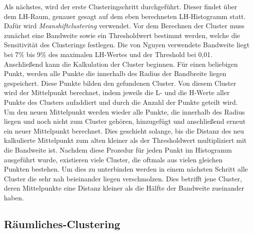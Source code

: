 Als nächstes, wird der erste Clusteringschritt durchgeführt. Dieser findet über dem LH-Raum, genauer gesagt auf dem eben berechneten LH-Histogramm statt. Dafür wird \textit{Meanshiftclustering} verwendet.
\newline
Vor dem Berechnen der Cluster muss zunächst eine Bandweite sowie ein Thresholdwert bestimmt werden, welche die Sensitivität des Clusterings festlegen.
\newline
Die von Nguyen \cite{nguyen2012clustering} verwendete Bandweite liegt bei 7\% bis 9\% des maximalen LH-Wertes und der Threshold bei 0,01. Anschließend kann die Kalkulation der Cluster beginnen.
\newline
Für einen beliebigen Punkt, werden alle Punkte die innerhalb des Radius der Bandbreite liegen gespeichert. Diese Punkte bilden den gefundenen Cluster. Von diesem Cluster wird der Mittelpunkt berechnet, indem jeweils die L- und die H-Werte aller Punkte des Clusters aufaddiert und durch die Anzahl der Punkte geteilt wird.
\newline
Um den neuen Mittelpunkt werden wieder alle Punkte, die innerhalb des Radius liegen und noch nicht zum Cluster gehören, hinzugefügt und anschließend erneut ein neuer Mittelpunkt berechnet.
\newline
Dies geschieht solange, bis die Distanz des neu kalkulierte Mittelpunkt zum alten kleiner als der Thresholdwert multipliziert mit die Bandweite ist. 
\newline
Nachdem diese Prozedur für jeden Punkt im Histogramm ausgeführt wurde, existieren viele Cluster, die oftmals aus vielen gleichen Punkten bestehen.
\newline
Um dies zu unterbinden werden in einem nächsten Schritt alle Cluster die sehr nah beieinander liegen verschmolzen. Dies betrifft jene Cluster, deren Mittelpunkte eine Distanz kleiner als die Hälfte der Bandweite zueinander haben.



\subsection{Räumliches-Clustering}

